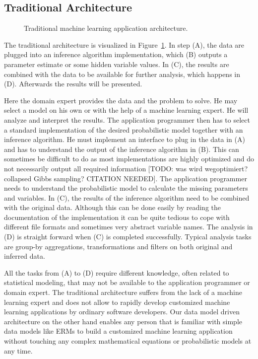 \subsection{Traditional Architecture}

\begin{figure}[t]
\centering
\scalebox{\tikzScale}{\adjustTikzSize }
\caption[Traditional machine learning application architecture]{Traditional machine learning application architecture.}\label{fig:ml-application-architecture}
\end{figure}

The traditional architecture is visualized in Figure~\ref{fig:ml-application-architecture}. In step (A), the data are plugged into an inference algorithm implementation, which (B) outputs a parameter estimate or some hidden variable values. In (C), the results are combined with the data to be available for further analysis, which happens in (D). Afterwards the results will be presented.

Here the domain expert provides the data and the problem to solve. He may select a model on his own or with the help of a machine learning expert. He will analyze and interpret the results. The application programmer then has to select a standard implementation of the desired probabilistic model together with an inference algorithm. He must implement an interface to plug in the data in (A) and has to understand the output of the inference algorithm in (B). This can sometimes be difficult to do as most implementations are highly optimized and do not necessarily output all required information [TODO: was wird wegoptimiert? collapsed Gibbs sampling? CITATION NEEDED]. The application programmer needs to understand the probabilistic model to calculate the missing parameters and variables. In (C), the results of the inference algorithm need to be combined with the original data. Although this can be done easily by reading the documentation of the implementation it can be quite tedious to cope with different file formats and sometimes very abstract variable names. The analysis in (D) is straight forward when (C) is completed successfully. Typical analysis tasks are group-by aggregations, transformations and filters on both original and inferred data.

All the tasks from (A) to (D) require different knowledge, often related to statistical modeling, that may not be available to the application programmer or domain expert. The traditional architecture suffers from the lack of a machine learning expert and does not allow to rapidly develop customized machine learning applications by ordinary software developers. Our data model driven architecture on the other hand enables any person that is familiar with simple data models like ERMs to build a customized machine learning application without touching any complex mathematical equations or probabilistic models at any time.


